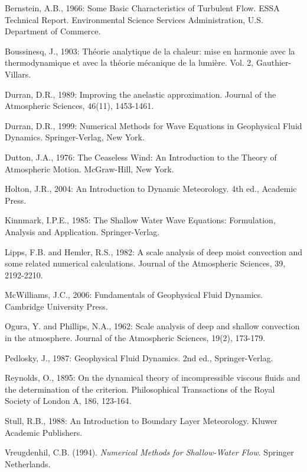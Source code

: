 \documentclass{article}
\begin{document}
\begin{thebibliography}{99}

 Bernstein, A.B., 1966: Some Basic Characteristics of Turbulent Flow. ESSA Technical Report. Environmental Science Services Administration, U.S. Department of Commerce.

 Boussinesq, J., 1903: Théorie analytique de la chaleur: mise en harmonie avec la thermodynamique et avec la théorie mécanique de la lumière. Vol. 2, Gauthier-Villars.

 Durran, D.R., 1989: Improving the anelastic approximation. Journal of the Atmospheric Sciences, 46(11), 1453-1461.

 Durran, D.R., 1999: Numerical Methods for Wave Equations in Geophysical Fluid Dynamics. Springer-Verlag, New York.

 Dutton, J.A., 1976: The Ceaseless Wind: An Introduction to the Theory of Atmospheric Motion. McGraw-Hill, New York.

 Holton, J.R., 2004: An Introduction to Dynamic Meteorology. 4th ed., Academic Press.

 Kinnmark, I.P.E., 1985: The Shallow Water Wave Equations: Formulation, Analysis and Application. Springer-Verlag.

 Lipps, F.B. and Hemler, R.S., 1982: A scale analysis of deep moist convection and some related numerical calculations. Journal of the Atmospheric Sciences, 39, 2192-2210.

 McWilliams, J.C., 2006: Fundamentals of Geophysical Fluid Dynamics. Cambridge University Press.

 Ogura, Y. and Phillips, N.A., 1962: Scale analysis of deep and shallow convection in the atmosphere. Journal of the Atmospheric Sciences, 19(2), 173-179.

 Pedlosky, J., 1987: Geophysical Fluid Dynamics. 2nd ed., Springer-Verlag.

 Reynolds, O., 1895: On the dynamical theory of incompressible viscous fluids and the determination of the criterion. Philosophical Transactions of the Royal Society of London A, 186, 123-164.

 Stull, R.B., 1988: An Introduction to Boundary Layer Meteorology. Kluwer Academic Publishers.

Vreugdenhil, C.B. (1994). \textit{Numerical Methods for Shallow-Water Flow}. Springer Netherlands.


\end{thebibliography}
\end{document}

